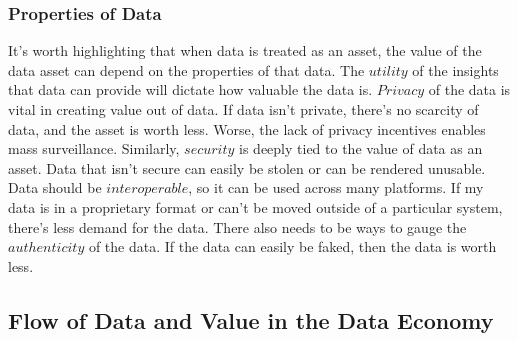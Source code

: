 

\subsubsection{Properties of Data}
It's worth highlighting that when data is treated as an asset, the value of the data asset can depend on the properties of that data. The $\mathit{utility}$ of the insights that data can provide will dictate how valuable the data is. $\mathit{Privacy}$ of the data is vital in creating value out of data. If data isn't private, there's no scarcity of data, and the asset is worth less. Worse, the lack of privacy incentives enables mass surveillance.
Similarly, $\mathit{security}$ is deeply tied to the value of data as an asset. Data that isn't secure can easily be stolen or can be rendered unusable. 
Data should be $\mathit{interoperable}$, so it can be used across many platforms. If my data is in a proprietary format or can't be moved outside of a particular system, there's less demand for the data. 
There also needs to be ways to gauge the $\mathit{authenticity}$ of the data. If the data can easily be faked, then the data is worth less.






\subsection{Flow of Data and Value in the Data Economy}
\label{section:Actors}

